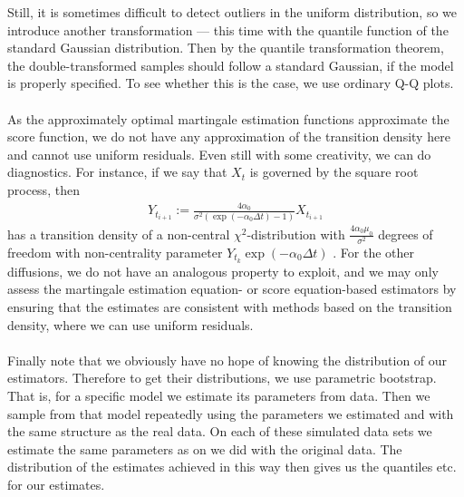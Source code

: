 Still, it is sometimes difficult to detect outliers in the uniform distribution, so we introduce another transformation — this time with the quantile function of the standard Gaussian distribution. Then by the quantile transformation theorem, the double-transformed samples should follow a standard Gaussian, if the model is properly specified. To see whether this is the case, we use ordinary Q-Q plots.\\\\
As the approximately optimal martingale estimation functions approximate the score function, we do not have any approximation of the transition density here and cannot use uniform residuals. Even still with some creativity, we can do diagnostics. For instance, if we say that $X_t$ is governed by the square root process, then
\begin{align}
    Y_{t_{i + 1}} := \frac{4\alpha_0}{\sigma^2\left(\exp\left(-\alpha_0 \Delta t\right) - 1\right)}X_{t_{i + 1}}
\end{align}
has a transition density of a non-central $\chi^2$-distribution with $\frac{4\alpha_0\mu_0}{\sigma^2}$ degrees of freedom with non-centrality parameter $Y_{t_k}\exp\left(-\alpha_0 \Delta t\right)$ \cite[Equation (5.68)]{Srkk2019}. For the other diffusions, we do not have an analogous property to exploit, and we may only assess the martingale estimation equation- or score equation-based estimators by ensuring that the estimates are consistent with methods based on the transition density, where we can use uniform residuals.\\\\
Finally note that we obviously have no hope of knowing the distribution of our estimators. Therefore to get their distributions, we use parametric bootstrap. That is, for a specific model we estimate its parameters from data. Then we sample from that model repeatedly using the parameters we estimated and with the same structure as the real data. On each of these simulated data sets we estimate the same parameters as on we did with the original data. The distribution of the estimates achieved in this way then gives us the quantiles etc. for our estimates.